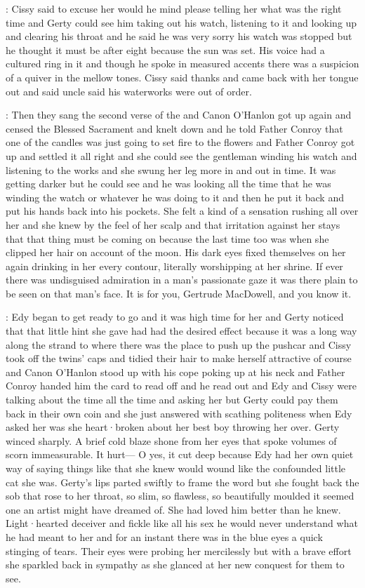 :
Cissy said to excuse her would he mind please telling her what was the
right time and Gerty could see him taking out his watch,
listening to it
and looking up and clearing his throat and he said he was very sorry his
watch was stopped but he thought it must be after eight because the sun
was set.
His voice had a cultured ring in it and though he spoke in
measured accents there was a suspicion of a quiver in the mellow tones.
Cissy said thanks and came back with her tongue out
and said uncle said
his waterworks were out of order.

:
Then they sang the second verse of the  and Canon
O'Hanlon got up again and censed the Blessed Sacrament and knelt down and
he told Father Conroy that one of the candles was just going to set fire
to the flowers and Father Conroy got up and settled it all right and she
could see the gentleman winding his watch and listening to the works and
she swung her leg more in and out in time.
It was getting darker but he
could see and he was looking all the time that he was winding the watch or
whatever he was doing to it and then he put it back and put his hands back
into his pockets.
She felt a kind of a sensation rushing all over her and
she knew by the feel of her scalp and that irritation against her stays
that that thing must be coming on because the last time too was when she
clipped her hair on account of the moon.
His dark eyes fixed themselves
on her again drinking in her every contour,
literally worshipping at her shrine.
If ever there was undisguised admiration in a man's passionate
gaze it was there plain to be seen on that man's face.
It is for you,
Gertrude MacDowell,
and you know it.

:
Edy began to get ready to go and it was high time for her and Gerty
noticed that that little hint she gave had had the desired effect because
it was a long way along the strand
to where there was the place to push up
the pushcar and Cissy took off the twins' caps and tidied their hair to
make herself attractive of course and Canon O'Hanlon stood up with his
cope poking up at his neck and Father Conroy handed him the card to read
off and he read out  and Edy and Cissy were
talking about the time all the time and asking her but Gerty could pay
them back in their own coin and she just answered with scathing politeness
when Edy asked her was she heart·broken about her best boy throwing her
over.
Gerty winced sharply.
A brief cold blaze shone from her eyes that
spoke volumes of scorn immeasurable.
It hurt—%
O yes,
it cut deep because
Edy had her own quiet way of saying things like that
she knew would wound
like the confounded little cat she was.
Gerty's lips parted swiftly to
frame the word but she fought back the sob that rose to her throat,
so slim,
so flawless,
so beautifully moulded it seemed one an artist
might have dreamed of.
She had loved him better than he knew.
Light·hearted deceiver and fickle like all his sex he would never
understand what he had meant to her and for an instant there was
in the blue eyes a quick stinging of tears.
Their eyes were
probing her mercilessly but with a brave effort she sparkled back in
sympathy as she glanced at her new conquest for them to see.

